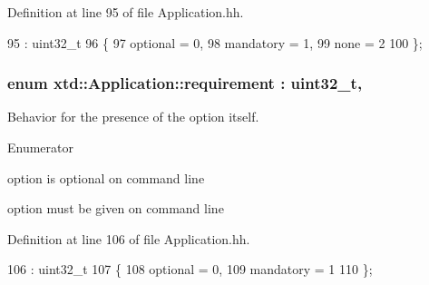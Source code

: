 Definition at line 95 of file Application.\+hh.


\begin{DoxyCode}
95                       : uint32\_t
96   \{
97     optional  = 0, 
98     mandatory = 1, 
99     none      = 2  
100   \};
\end{DoxyCode}
\subsubsection[{\texorpdfstring{requirement}{requirement}}]{\setlength{\rightskip}{0pt plus 5cm}enum {\bf xtd\+::\+Application\+::requirement} \+: uint32\+\_\+t\hspace{0.3cm}{\ttfamily [strong]}, {\ttfamily [protected]}}\hypertarget{classxtd_1_1Application_a49c0397e9fd22067e3a536443a17fe24}{}\label{classxtd_1_1Application_a49c0397e9fd22067e3a536443a17fe24}


Behavior for the presence of the option itself. 

\begin{Desc}
\item[Enumerator]\par
\begin{description}
\item[{\em 
optional\hypertarget{classxtd_1_1Application_a49c0397e9fd22067e3a536443a17fe24ad57c24f3fe52d16e7169b912dd647f0d}{}\label{classxtd_1_1Application_a49c0397e9fd22067e3a536443a17fe24ad57c24f3fe52d16e7169b912dd647f0d}
}]option is optional on command line \item[{\em 
mandatory\hypertarget{classxtd_1_1Application_a49c0397e9fd22067e3a536443a17fe24ac5e3b9675d114c21ad3367d318f6aa95}{}\label{classxtd_1_1Application_a49c0397e9fd22067e3a536443a17fe24ac5e3b9675d114c21ad3367d318f6aa95}
}]option must be given on command line \end{description}
\end{Desc}


Definition at line 106 of file Application.\+hh.


\begin{DoxyCode}
106                          : uint32\_t
107   \{
108     optional  = 0, 
109     mandatory = 1  
110   \};
\end{DoxyCode}


